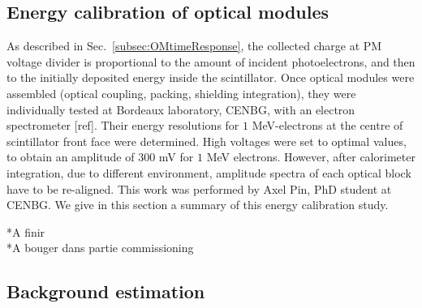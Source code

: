 \subsection{Energy calibration of optical modules}
\label{subsec:OMenergyCalib}

As described in Sec.~\ref{subsec:OMtimeResponse}, the collected charge at PM voltage divider is proportional to the amount of incident photoelectrons, and then to the initially deposited energy inside the scintillator.
Once optical modules were assembled (optical coupling, packing, shielding integration), they were individually tested at Bordeaux laboratory, CENBG, with an electron spectrometer [ref].
Their energy resolutions for $1$ MeV-electrons at the centre of scintillator front face were determined.
High voltages were set to optimal values, to obtain an amplitude of $300$ mV for $1$ MeV electrons.
However, after calorimeter integration, due to different environment, amplitude spectra of each optical block have to be re-aligned.
This work was performed by Axel Pin, PhD student at CENBG.
We give in this section a summary of this energy calibration study.

*A finir\\
*A bouger dans partie commissioning


\subsection{Background estimation}
\label{subsec:bkg_estimation}

